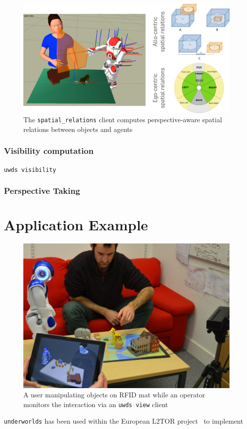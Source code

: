 \documentclass[letterpaper, 10 pt, conference]{ieeeconf}  %
\newcommand{\uwds}{{\tt underworlds}\xspace}
\begin{document}
\begin{figure}
    \centering
    \includegraphics[width=0.9\linewidth]{spatialrelations}
    \caption{The {\tt spatial\_relations} client computes perspective-aware
    spatial relations between objects and agents}
    \label{fig|spatialrelations}
\end{figure}

\cite{Ros2010}

\subsubsection{Visibility computation}

{\tt uwds visibility}

\subsubsection{Perspective Taking}


\section{Application Example}

\begin{figure}
    \centering
    \includegraphics[width=\linewidth]{l2tor-photo2}
    \caption{A user manipulating objects on RFID mat while an operator monitors the interaction via an {\tt uwds view} client}
    \label{fig|l2torexample}
\end{figure}
\uwds has been used within the European L2TOR project~\cite{L2TOR} to implement 
\end{document}
